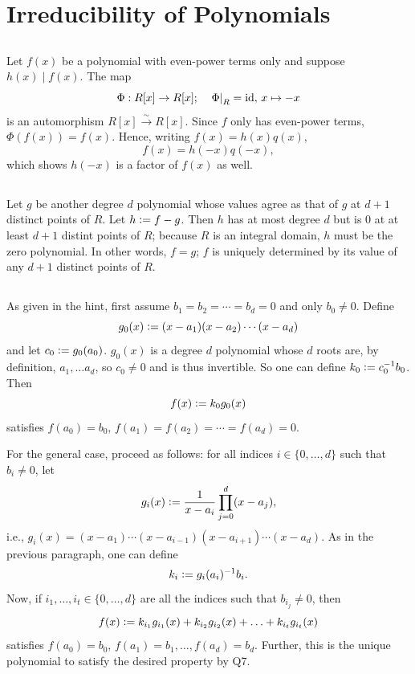 \documentclass[12pt]{article}
\begin{document}
\section{Irreducibility of Polynomials} 
\setcounter{subsection}{2} 
\subsection{}
Let $f(x)$ be a polynomial with even-power terms only and suppose $h(x) \mid f(x)$. 
The map 
$$\Phi: R[x] \rightarrow R[x]; \quad \left.\Phi\right|_{R} = \text{id}, \, x \mapsto -x$$ 
is an automorphism $R[x] \overset{\sim}{\rightarrow} R[x]$. 
Since $f$ only has even-power terms, $\Phi(f(x)) = f(x)$. 
Hence, writing $f(x) = h(x)q(x)$, 
$$f(x) = h(-x) q(-x),$$
which shows $h(-x)$ is a factor of $f(x)$ as well. 

\setcounter{subsection}{6} 
\subsection{} 
Let $g$ be another degree $d$ polynomial whose values agree as that of $g$ at $d + 1$ distinct points of $R$. 
Let $h \vcentcolon= f - g$. 
Then $h$ has at most degree $d$ but is 0 at at least $d + 1$ distint points of $R$; 
because $R$ is an integral domain, $h$ must be the zero polynomial. 
In other words, $f = g$; 
$f$ is uniquely determined by its value of any $d + 1$ distinct points of $R$. 

\subsection{} 
As given in the hint, first assume $b_1 = b_2 = \cdots = b_d = 0$ and only $b_0 \neq 0$. 
Define 
$$g_0(x) \vcentcolon= (x - a_1)(x - a_2) \cdots (x - a_d)$$ 
and let $c_0 \vcentcolon= g_0(a_0)$. 
$g_0(x)$ is a degree $d$ polynomial whose $d$ roots are, by definition, $a_1, \ldots a_d$, so $c_0 \neq 0$ and is thus invertible. 
So one can define $k_0 \vcentcolon= c_0^{-1} b_0$. 
Then 
$$f(x) \vcentcolon= k_0 g_0(x)$$ 
satisfies $f(a_0) = b_0, \, f(a_1) = f(a_2) = \cdots = f(a_d) = 0$. 

For the general case, proceed as follows: 
for all indices $i \in \{0, \ldots, d\}$ such that $b_i \neq 0$, let 
$$g_i(x) \vcentcolon= \frac{1}{x - a_i} \prod_{j = 0}^{d} (x - a_j),$$ 
i.e., $g_i(x) = (x - a_1) \cdots (x - a_{i - 1}) (x - a_{i + 1}) \cdots (x - a_d).$
As in the previous paragraph, one can define 
$$k_i \vcentcolon= g_i(a_i)^{-1} b_i.$$
Now, if $i_1, \ldots, i_t \in \{0, \ldots, d\}$ are all the indices such that $b_{i_j} \neq 0$, then 
$$f(x) \vcentcolon= k_{i_1} g_{i_1}(x) + k_{i_2}g_{i_2}(x) + \ldots + k_{i_t} g_{i_t}(x)$$
satisfies $f(a_0) = b_0, \, f(a_1) = b_1, \ldots, f(a_d) = b_d$. 
Further, this is the unique polynomial to satisfy the desired property by Q7. 
\end{document}
